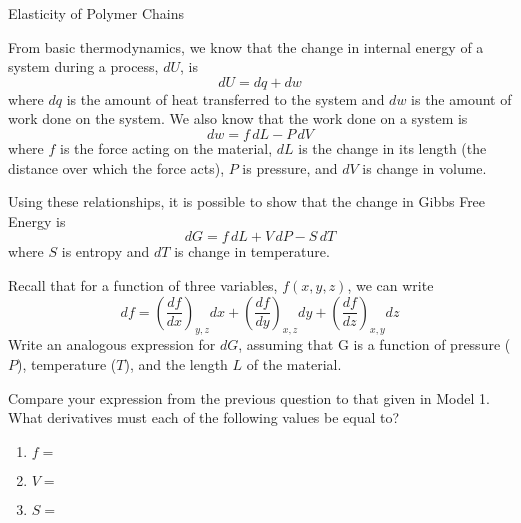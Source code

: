 \begin{activity}{Elasticity of Polymer Chains}
\begin{instructornotes}
\end{instructornotes}


\begin{model}
\label{model:delG}

	From basic thermodynamics, we know that the change in internal energy of a system during a process, $dU$, is
	\begin{equation*}
		dU = dq + dw
	\end{equation*}
	where $dq$ is the amount of heat transferred to the system and $dw$ is the amount of work done on the system.  We also know that the work done on a system is
	\begin{equation*}
		dw = f\,dL - P\,dV
	\end{equation*}
	where $f$ is the force acting on the material, $dL$ is the change in its length (the distance over which the force acts), $P$ is pressure, and $dV$ is change in volume.
	
	Using these relationships, it is possible to show that the change in Gibbs Free Energy is
	\begin{equation*}
		dG = f\,dL + V\,dP - S\,dT
	\end{equation*}
	where $S$ is entropy and $dT$ is change in temperature.

\end{model}


\begin{ctqs}

	\question Recall that for a function of three variables, $f(x,y,z)$, we can write
		\begin{equation*}
			df = \left(\frac{df}{dx}\right)_{y,z}dx + 
				\left(\frac{df}{dy}\right)_{x,z}dy +
				\left(\frac{df}{dz}\right)_{x,y}dz
		\end{equation*}
		Write an analogous expression for $dG$, assuming that G is a function of pressure ($P$), temperature ($T$), and the length $L$ of the material.
		
		\begin{solution}[1in]
		\end{solution}
		
	\question Compare your expression from the previous question to that given in Model 1.  What derivatives must each of the following values be equal to?
	
		\begin{enumerate}
			\item $f=$
				\begin{solution}[0.5in]
				\end{solution}
			\item $V=$
				\begin{solution}[0.5in]
				\end{solution}
			\item $S=$
				\begin{solution}[0.5in]
				\end{solution}
		\end{enumerate}
		

\end{ctqs}
\end{activity}
